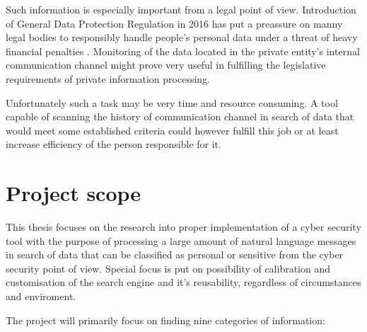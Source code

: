 \documentclass[a4paper,twoside,12pt]{book}
\begin{document}
Such information is especially important from a legal point of view. Introduction of General Data Protection
Regulation in 2016 has put a preassure on manny legal bodies to responsibly handle people's personal data under
a threat of heavy financial penalties \cite{bib:bookRODO}. Monitoring of the data located in the private entity's internal communication
channel might prove very useful in fulfilling the legislative requirements of private information processing.

Unfortunately such a task may be very time and resource consuming. A tool capable of scanning the history of 
communication channel in search of data that would meet some established criteria could however fulfill this job or at least
increase efficiency of the person responsible for it.

\section{Project scope}

This thesis focuses on the research into proper implementation of a cyber security tool with the purpose of processing 
a large amount of natural language messages in search of data that can be classified as personal or sensitive from the cyber security
point of view. Special focus is put on possibility of calibration and customisation of the search engine and it's reusability, regardless of 
circumstances and enviroment.

The project will primarily focus on finding nine categories of information:
\end{document}
